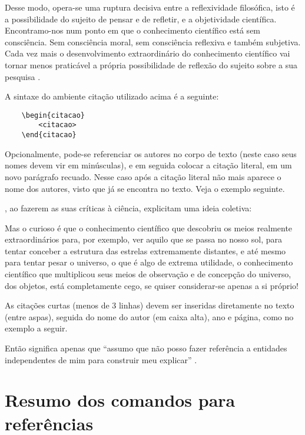 \begin{citacao}
Desse modo, opera-se uma ruptura decisiva entre a reflexividade filosófica, isto 	é a possibilidade do sujeito de pensar e de refletir, e a objetividade científica.
Encontramo-nos num ponto em que o conhecimento científico está sem consciência.
Sem consciência moral, sem consciência reflexiva e também subjetiva.
Cada vez mais o desenvolvimento extraordinário do conhecimento científico vai tornar menos praticável a própria possibilidade de reflexão do sujeito sobre a sua pesquisa \cite[p.~28]{morinmoigne:2000}.
\end{citacao}

A sintaxe do ambiente citação utilizado acima é a seguinte:
\begin{verbatim}
    \begin{citacao}
        <citacao>
    \end{citacao}
\end{verbatim}

Opcionalmente, pode-se referenciar os autores no corpo de texto (neste caso seus nomes devem vir em minúsculas), e em seguida colocar a citação literal, em um novo parágrafo recuado. Nesse caso após a citação literal não mais aparece o nome dos autores, visto que já se encontra no texto.
Veja o exemplo seguinte.

, ao fazerem as suas críticas à ciência, explicitam uma ideia coletiva:

\begin{citacao}
Mas o curioso é que o conhecimento científico que descobriu os meios realmente extraordinários para, por exemplo, ver aquilo que se passa no nosso sol, para tentar conceber a estrutura das estrelas extremamente distantes, e até mesmo para tentar pesar o universo, o que é algo de extrema utilidade, o conhecimento científico que multiplicou seus meios de observação e de concepção do universo, dos objetos, está completamente cego, se quiser considerar-se apenas a si próprio!
\end{citacao}

As citações curtas (menos de 3 linhas) devem ser inseridas diretamente no texto (entre aspas), seguida do nome do autor (em caixa alta), ano e página, como no exemplo a seguir.

Então significa apenas que ``assumo que não posso fazer referência a entidades independentes de mim para construir meu explicar'' \cite[p.~35]{maturana:2003}.

\section{Resumo dos comandos para  referências }\label{referenciasUtilizadas}

